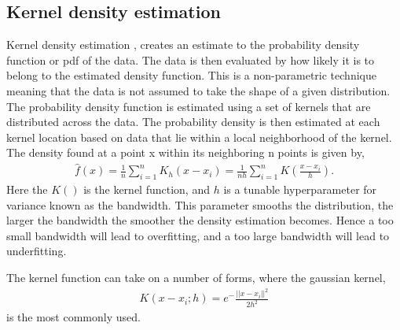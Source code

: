         
    
    \subsection{Kernel density estimation}\label{subsec:kde}
        Kernel density estimation \cite{Latecki}, creates an estimate to the probability density function or pdf of the data. The data is then evaluated by how likely it is to belong to the estimated density function. This is a non-parametric technique meaning that the data is not assumed to take the shape of a given distribution. The probability density function is estimated using a set of kernels that are distributed across the data. The probability density is then estimated at each kernel location based on data that lie within a local neighborhood of the kernel. The density found at a point x within its neighboring n points is given by, 
        \begin{align}
            \hat{f}(x) = \frac{1}{n} \sum_{i=1}^n K_h(x-x_i)  = \frac{1}{nh} \sum_{i=1}^n K(\frac{x-x_i}{h}).
        \end{align}
        Here the $K()$ is the kernel function, and $h$ is a tunable hyperparameter for variance known as the bandwidth. This parameter smooths the distribution, the larger the bandwidth the smoother the density estimation becomes. Hence a too small bandwidth will lead to overfitting, and a too large bandwidth will lead to underfitting.   
        
        The kernel function can take on a number of forms, where the gaussian kernel,
        \begin{align}
            K(x-x_i;h) = e^-\frac{||x-x_i||^2}{2h^2}
        \end{align}
        is the most commonly used.
        
        
        
    

